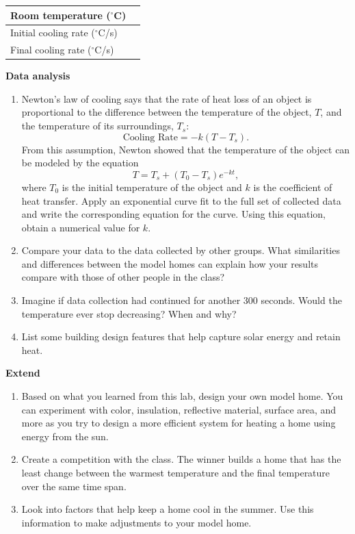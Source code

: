 \documentclass[english,twoside]{article}
\begin{document}
\begin{center}
\begin{tabular}{ | M{4.0cm} | M{4.0cm} |}
 \hline
 Room temperature ($^\circ$C) & \\ \hline
 Initial cooling rate ($^\circ$C/s) & \\[15pt] \hline
 Final cooling rate ($^\circ$C/s) & \\[15pt] \hline
\end{tabular}
\end{center}
	 
\textbf{Data analysis}
\begin{enumerate} 
	\item Newton's law of cooling says that the rate of heat loss of an object is proportional to the difference between the temperature of the object, $T$, and the temperature of its surroundings, $T_s$:
\begin{equation*}
	\text{Cooling Rate} = -k(T - T_s) .
\end{equation*}
	From this assumption, Newton showed that the temperature of the object can be modeled by the equation
	\begin{equation*}
		T = T_s + (T_0 - T_s) e^{-kt} ,
	\end{equation*}
	where $T_0$ is the initial temperature of the object and $k$ is the coefficient of heat transfer. Apply an exponential curve fit to the full set of collected data and write the corresponding equation for the curve. Using this equation, obtain a numerical value for $k$.
\answerspace{2.5in}

	\item Compare your data to the data collected by other groups. What similarities and differences between the model homes can explain how your results compare with those of other people in the class? 
	\answerspace{2.5in}

	\item	Imagine if data collection had continued for another 300 seconds. Would the temperature ever stop decreasing? When and why?
	\answerspace{2.5in}

	\item List some building design features that help capture solar energy and retain heat.
	\answerspace{2.5in}
\end{enumerate}
\newpage
\textbf{Extend}
\begin{enumerate}
	\item Based on what you learned from this lab, design your own model home. You can experiment with color, insulation, reflective material, surface area, and more as you try to design a more efficient system for heating a home using energy from the sun. 
	\item Create a competition with the class. The winner builds a home that has the least change between the warmest temperature and the final temperature over the same time span.
	\item Look into factors that help keep a home cool in the summer. Use this information to make adjustments to your model home.
\end{enumerate}
\end{document}
